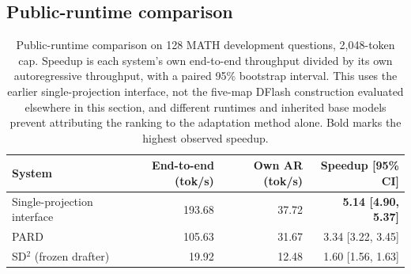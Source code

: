 \subsection{Public-runtime comparison}
\label{app:public-runtime}
\begin{table}[t]
\centering
\caption{Public-runtime comparison on 128 MATH development questions, 2{,}048-token cap. Speedup is each system's own end-to-end throughput divided by its own autoregressive throughput, with a paired 95\% bootstrap interval. This uses the earlier single-projection interface, not the five-map DFlash construction evaluated elsewhere in this section, and different runtimes and inherited base models prevent attributing the ranking to the adaptation method alone. Bold marks the highest observed speedup.}
\label{tab:public-runtime}
\small
\begin{tabular}{lrrr}
\toprule
System & End-to-end (tok/s) & Own AR (tok/s) & Speedup [95\% CI] \\
\midrule
Single-projection interface & 193.68 & 37.72 & \textbf{5.14 [4.90, 5.37]} \\
PARD & 105.63 & 31.67 & 3.34 [3.22, 3.45] \\
SD$^2$ (frozen drafter) & 19.92 & 12.48 & 1.60 [1.56, 1.63] \\
\bottomrule
\end{tabular}
\end{table}


